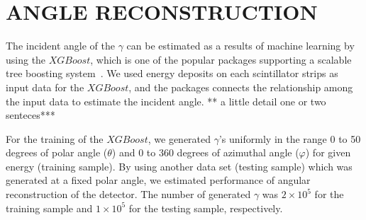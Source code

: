 \documentclass[jkps,preprint,fleqn,showpacs,showkeys]{revtex4}
\newcommand{\XGB}{XGBoost}
\begin{document}
\section{ANGLE RECONSTRUCTION}
\label{sec:res}

The incident angle of the $\gamma$ can be estimated as a results of machine learning by using the $\XGB$, which is one of the popular packages supporting a scalable tree boosting system~\cite{xgboost:2016}. We used energy deposits on each scintillator strips as input data for the $\XGB$, and the packages connects the relationship among the input data to estimate the incident angle. ** a little detail one or two senteces***


For the training of the $\XGB$, we generated $\gamma$'s uniformly in the range 0 to 50 degrees of polar angle ($\theta$) and  0 to 360 degrees of azimuthal angle ($\varphi$) for given energy (training sample). By using another data set (testing sample) which was generated at a fixed polar angle, we estimated performance of angular reconstruction of the detector. The number of generated $\gamma$ was
$2\times10^5$ for the training sample and $1\times10^5$ for the testing sample, respectively.

\end{document}
